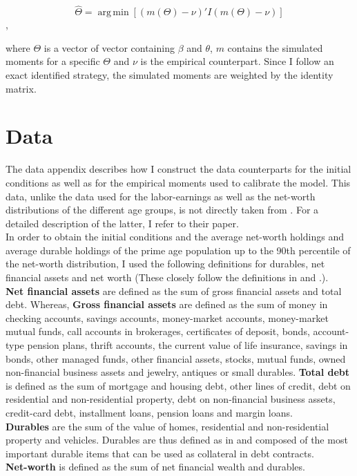 \documentclass[a4paper,12pt,legno]{article}
\begin{document}
\[ \widehat{\Theta} = \operatorname{arg\,min}[(m(\Theta )-\nu)'I(m(\Theta )-\nu)] \],

where $\Theta$ is a vector of vector containing $\beta$ and $\theta$, $m$ contains the simulated moments for a specific $\Theta$ and $\nu$ is the empirical counterpart. 
Since I follow an exact identified strategy, the simulated moments are weighted by the identity matrix. 

\section{Data}
\label{data}
The data appendix describes how I construct the data counterparts for the initial conditions as well as for the empirical moments used to calibrate the model. This data, unlike the data used for the labor-earnings as well as the net-worth distributions of the different age groups, is not directly taken from \cite{hintermaier2011}. For a detailed description of the latter, I refer to their paper. \\
In order to obtain the initial conditions and the average net-worth holdings and average durable holdings of the prime age population up to the 90th percentile of the net-worth distribution, I used the following definitions for durables, net financial assets and net worth (These closely follow the definitions in \cite{hintermaier2010} and \cite{hintermaier2011}.). \\
\textbf{Net financial assets} are defined as the sum of gross financial assets and total debt. Whereas, \textbf{Gross financial assets} are defined as the sum of money in checking accounts, savings accounts, money-market accounts, money-market mutual funds, call accounts in brokerages, certificates of deposit, bonds, account-type pension plans, thrift accounts, the current value of life insurance, savings in bonds, other managed funds, other financial assets, stocks, mutual funds, owned non-financial business assets and jewelry, antiques or small durables.
\textbf{Total debt} is defined as the sum of mortgage and housing debt, other lines of credit, debt on residential and non-residential property, debt on non-financial business assets, credit-card debt, installment loans, pension loans and margin loans.\\
\textbf{Durables} are the sum of the value of homes, residential and non-residential property and vehicles. Durables are thus defined as in \cite{hintermaier2010} and composed of the most important durable items that can be used as collateral in debt contracts. \\  \textbf{Net-worth} is defined as the sum of net financial wealth and durables.  \\
\end{document}
